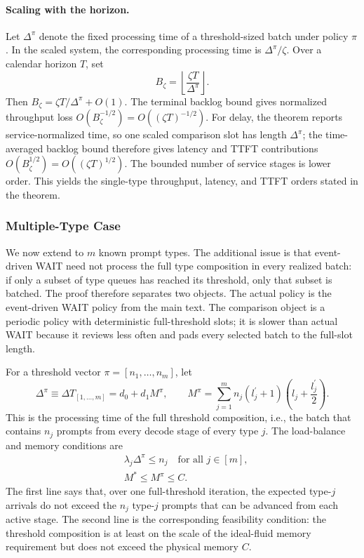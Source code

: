 \paragraph{Scaling with the horizon.} Let \(\Delta^\pi\) denote the fixed processing time of a threshold-sized batch under policy \(\pi\). In the scaled system, the corresponding processing time is \(\Delta^\pi/\zeta\). Over a calendar horizon \(T\), set
\[
    B_\zeta=\left\lfloor \frac{\zeta T}{\Delta^\pi}\right\rfloor .
\]
Then \(B_\zeta=\zeta T/\Delta^\pi+O(1)\). The terminal backlog bound gives normalized throughput loss \(O(B_\zeta^{-1/2})=O((\zeta T)^{-1/2})\). For delay, the theorem reports service-normalized time, so one scaled comparison slot has length \(\Delta^\pi\); the time-averaged backlog bound therefore gives latency and TTFT contributions \(O(B_\zeta^{1/2})=O((\zeta T)^{1/2})\). The bounded number of service stages is lower order. This yields the single-type throughput, latency, and TTFT orders stated in the theorem.

\subsubsection{Multiple-Type Case}

We now extend to \(m\) known prompt types. The additional issue is that event-driven WAIT need not process the full type composition in every realized batch: if only a subset of type queues has reached its threshold, only that subset is batched. The proof therefore separates two objects. The actual policy is the event-driven WAIT policy from the main text. The comparison object is a periodic policy with deterministic full-threshold slots; it is slower than actual WAIT because it reviews less often and pads every selected batch to the full-slot length.

For a threshold vector \(\pi=[n_1,\ldots,n_m]\), let
\begin{equation}\label{eq:batch_time_def}
\Delta^\pi \equiv \Delta T_{[1,\ldots,m]}
    =  d_0 + d_1 M^\pi,\qquad
M^\pi = \sum_{j=1}^m n_j(l_j^\prime+1)\left( l_j+\frac{l_j^\prime}{2} \right).
\end{equation}
This is the processing time of the full threshold composition, i.e., the batch that contains \(n_j\) prompts from every decode stage of every type \(j\). The load-balance and memory conditions are
\begin{equation}\label{eq:policy_constraints}
\begin{aligned}
&\lambda_j\Delta^\pi \leq n_j \quad \text{for all } j \in [m], \\
&M^{*}\leq M^{\pi}\leq C.
\end{aligned}
\end{equation}
The first line says that, over one full-threshold iteration, the expected type-\(j\) arrivals do not exceed the \(n_j\) type-\(j\) prompts that can be advanced from each active stage. The second line is the corresponding feasibility condition: the threshold composition is at least on the scale of the ideal-fluid memory requirement but does not exceed the physical memory \(C\).

